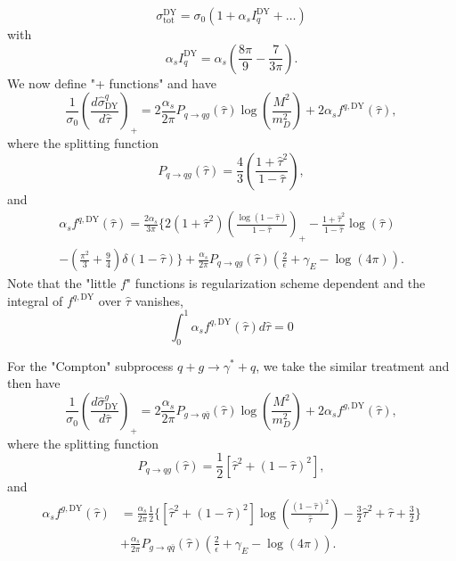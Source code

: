 \begin{equation}
\sigma^\text{DY}_\text{tot}=\sigma_0(1+\alpha_s I_q^\text{DY}+\ldots)
\end{equation}
with
\begin{equation}
\alpha_s I^\text{DY}_q=\alpha_s\left(\frac{8\pi}{9}-\frac{7}{3\pi}\right).
\end{equation}
We now define "+ functions" and have
\begin{equation}
\frac{1}{\sigma_0}\left(\frac{d\hat{\sigma}^q_\text{DY}}{d\hat{\tau}}\right)_+=2\frac{\alpha_s}{2\pi}P_{q\to qg}(\hat{\tau})\log\left(\frac{M^2}{m^2_D}\right)+2\alpha_s f^{q,\text{DY}}(\hat{\tau}),
\end{equation}
where the splitting function 
\begin{equation}
P_{q\to qg}(\hat{\tau})=\frac{4}{3}\left(\frac{1+\hat{\tau}^2}{1-\hat{\tau}}\right),
\end{equation}
and 
\begin{align}
\alpha_sf^{q,\text{DY}}(\hat{\tau})=\frac{2\alpha_s}{3\pi}\biggl\{ 2(1+\hat{\tau}^2)\left(\frac{\log(1-\hat{\tau})}{1-\hat{\tau}}\right)_+-\frac{1+\hat{\tau}^2}{1-\hat{\tau}}\log(\hat{\tau})\nonumber\\
-\left(\frac{\pi^2}{3}+\frac{9}{4}\right)\delta(1-\hat{\tau}) \biggr\}+\frac{\alpha_s}{2\pi}P_{q\to qg}(\hat{\tau})\left(\frac{2}{\epsilon}+\gamma_E-\log(4\pi)\right).
\end{align}
Note that the "little $f$" functions is regularization scheme dependent and the integral of $f^{q,\text{DY}}$ over $\hat{\tau}$ vanishes,
\begin{equation}
\int_{0}^{1}\alpha_s f^{q,\text{DY}}(\hat{\tau})d\hat{\tau}=0
\end{equation}

For the "Compton" subprocess $q+g\to\gamma^\ast+q$, we take the similar treatment and then have
\begin{equation}
\frac{1}{\sigma_0}\left(\frac{d\hat{\sigma}^g_\text{DY}}{d\hat{\tau}}\right)_+=2\frac{\alpha_s}{2\pi}P_{g\to q\bar{q}}(\hat{\tau})\log\left(\frac{M^2}{m^2_D}\right)+2\alpha_s f^{g,\text{DY}}(\hat{\tau}),
\end{equation}
where the splitting function 
\begin{equation}
P_{q\to qg}(\hat{\tau})=\frac{1}{2}[\hat{\tau}^2+(1-\hat{\tau})^2],
\end{equation}
and 
\begin{align}
\alpha_s f^{g,\text{DY}}(\hat{\tau})&=\frac{\alpha_s}{2\pi}\frac{1}{2}\biggl\{ [\hat{\tau}^2+(1-\hat{\tau})^2]\log\left(\frac{(1-\hat{\tau})^2}{\hat{\tau}}\right)-\frac{3}{2}\hat{\tau}^2+\hat{\tau}+\frac{3}{2} \biggr\}\nonumber\\
&+\frac{\alpha_s}{2\pi}P_{g\to q\bar{q}}(\hat{\tau})\left(\frac{2}{\epsilon}+\gamma_E-\log(4\pi)\right).
\end{align}

